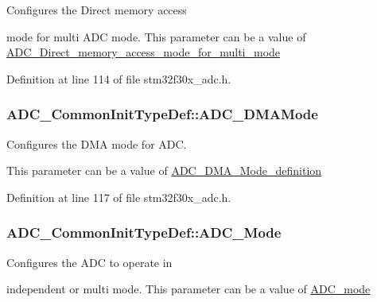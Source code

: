 \begin{DoxyVerb}              Configures the Direct memory access 
\end{DoxyVerb}
 mode for multi A\-D\-C mode. This parameter can be a value of \hyperlink{group___a_d_c___direct__memory__access__mode__for__multi__mode}{A\-D\-C\-\_\-\-Direct\-\_\-memory\-\_\-access\-\_\-mode\-\_\-for\-\_\-multi\-\_\-mode} 

Definition at line 114 of file stm32f30x\-\_\-adc.\-h.

\hypertarget{struct_a_d_c___common_init_type_def_a43289ee35ebde4309c3b9d8c467d259c}{
\subsubsection[{A\-D\-C\-\_\-\-D\-M\-A\-Mode}]{ A\-D\-C\-\_\-\-Common\-Init\-Type\-Def\-::\-A\-D\-C\-\_\-\-D\-M\-A\-Mode}}\label{struct_a_d_c___common_init_type_def_a43289ee35ebde4309c3b9d8c467d259c}
\begin{DoxyVerb}                  Configures the DMA mode for ADC.                                             
\end{DoxyVerb}
 This parameter can be a value of \hyperlink{group___a_d_c___d_m_a___mode__definition}{A\-D\-C\-\_\-\-D\-M\-A\-\_\-\-Mode\-\_\-definition} 

Definition at line 117 of file stm32f30x\-\_\-adc.\-h.

\hypertarget{struct_a_d_c___common_init_type_def_a9ac2a96e9bbbec4b680ab250051a7b54}{
\subsubsection[{A\-D\-C\-\_\-\-Mode}]{ A\-D\-C\-\_\-\-Common\-Init\-Type\-Def\-::\-A\-D\-C\-\_\-\-Mode}}\label{struct_a_d_c___common_init_type_def_a9ac2a96e9bbbec4b680ab250051a7b54}
\begin{DoxyVerb}                      Configures the ADC to operate in 
\end{DoxyVerb}
 independent or multi mode. This parameter can be a value of \hyperlink{group___a_d_c__mode}{A\-D\-C\-\_\-mode}

